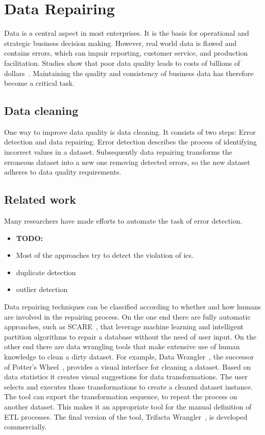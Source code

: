 
\section{Data Repairing}\label{sec:introduction}
  Data is a central aspect in most enterprises.
  It is the basis for operational and strategic business decision making.
  However, real world data is flawed and contains errors, which can impair reporting, customer service, and production facilitation.
  Studies show that poor data quality leads to costs of billions of dollars~\cite{Redman:quality_disaster, cost_of_low_qual}.
  Maintaining the quality and consistency of business data has therefore become a critical task.

  \subsection{Data cleaning}
  One way to improve data quality is data cleaning.
  It consists of two steps: Error detection and data repairing.
  Error detection describes the process of identifying incorrect values in a dataset.
  Subsequently data repairing transforms the erroneous dataset into a new one removing detected errors, so the new dataset adheres to data quality requirements.

  \subsection{Related work}
  Many researchers have made efforts to automate the task of error detection.
  \begin{itemize}
    \item \textbf{TODO:}
    \item Most of the approaches try to detect the violation of \glspl{ic}.
    \item duplicate detection
    \item outlier detection
  \end{itemize}

  Data repairing techniques can be classified according to whether and how humans are involved in the repairing process.
  On the one end there are fully automatic approaches, such as SCARE~\cite{scare}, that leverage machine learning and intelligent partition algorithms to repair a database without the need of user input.
  On the other end there are data wrangling tools that make extensive use of human knowledge to clean a dirty dataset.
  For example, Data Wrangler~\cite{data_wrangler}, the successor of Potter's Wheel~\cite{potters_wheel}, provides a visual interface for cleaning a dataset.
  Based on data statistics it creates visual suggestions for data transformations.
  The user selects and executes those transformations to create a cleaned dataset instance.
  The tool can export the transformation sequence, to repeat the process on another dataset.
  This makes it an appropriate tool for the manual definition of ETL processes.
  The final version of the tool, Trifacta Wrangler~\cite{trifacta_wrangler}, is developed commercially.

